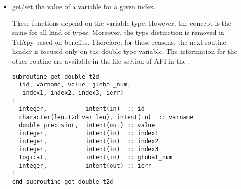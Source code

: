 \begin{itemize}
\begin{lstlisting}
subroutine get_var_size_t2d(id, varname,
                            dim1, dim2, dim3, ierr)
!
  integer,               intent(in) :: id
  character(len=t2d_var_len), intent(in)  :: varname
  integer,               intent(out) :: dim1
  integer,               intent(out) :: dim2
  integer,               intent(out) :: dim3
  integer,               intent(out) :: ierr
!
end subroutine get_var_size_t2d
\end{lstlisting}
%
\begin{itemize}
\item \textbf{id}: The id of the instance.
\item \textbf{varname}: The name of the variable.
\item \textbf{dim1}: Size of the first dimension.
\item \textbf{dim2}: Size of the second dimension.
\item \textbf{dim3}: Size of the third dimension.
\item \textbf{ierr}: 0 if everything went smoothly, an error index otherwise.
\end{itemize}
%
\begin{CommentBlock}{Comment:}
\centering
If the desired variable is a scalar then, it has no first, second or third
dimension and \verb!dim1!, \verb! dim2!, \verb! dim3! are equal to zero.
\end{CommentBlock}

\item get/set the value of a variable for a given index.

These functions depend on the variable type. However, the concept is the same
for all kind of types. Moreover, the type distinction is removed in TelApy based
on \python benefits. Therefore, for these reasons, the next routine header is
focused only on the double type variable. The information for the other routine
are available in the \fortran file section of API in the \telemacsystem.

\begin{lstlisting}
subroutine get_double_t2d
  (id, varname, value, global_num,
   index1, index2, index3, ierr)
!
  integer,           intent(in)  :: id
  character(len=t2d_var_len), intent(in)  :: varname
  double precision,  intent(out) :: value
  integer,           intent(in)  :: index1
  integer,           intent(in)  :: index2
  integer,           intent(in)  :: index3
  logical,           intent(in)  :: global_num
  integer,           intent(out) :: ierr
!
end subroutine get_double_t2d
\end{lstlisting}


\end{itemize}
